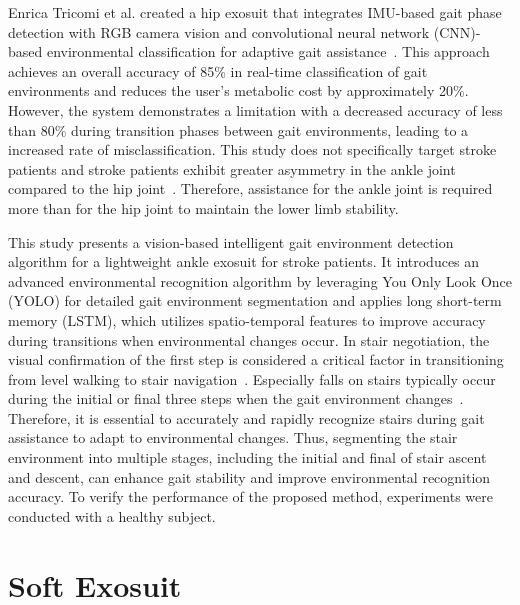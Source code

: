 \documentclass[journal,article,submit,pdftex,moreauthors]{Definitions/mdpi}
\begin{document}
Enrica Tricomi et al. created a hip exosuit that integrates IMU-based gait phase detection with RGB camera vision and convolutional neural network (CNN)-based environmental classification for adaptive gait assistance~\cite{Tricomi2023}. This approach achieves an overall accuracy of 85\% in real-time classification of gait environments and reduces the user's metabolic cost by approximately 20\%. However, the system demonstrates a limitation with a decreased accuracy of less than 80\% during transition phases between gait environments, leading to a increased rate of misclassification. This study does not specifically target stroke patients and stroke patients exhibit greater asymmetry in the ankle joint compared to the hip joint~\cite{Ogihara2020}. Therefore, assistance for the ankle joint is required more than for the hip joint to maintain the lower limb stability.

This study presents a vision-based intelligent gait environment detection algorithm for a lightweight ankle exosuit for stroke patients. It introduces an advanced environmental recognition algorithm by leveraging You Only Look Once (YOLO) for detailed gait environment segmentation and applies long short-term memory (LSTM), which utilizes spatio-temporal features to improve accuracy during transitions when environmental changes occur.
In stair negotiation, the visual confirmation of the first step is considered a critical factor in transitioning from level walking to stair navigation~\cite{Archea1979}. Especially falls on stairs typically occur during the initial or final three steps when the gait environment changes~\cite{Templer1995}. Therefore, it is essential to accurately and rapidly recognize stairs during gait assistance to adapt to environmental changes. 
 Thus, segmenting the stair environment into multiple stages, including the initial and final of stair ascent and descent, can enhance gait stability and improve environmental recognition accuracy.
To verify the performance of the proposed method, experiments were conducted with a healthy subject. 


\section{Soft Exosuit}
\end{document}
